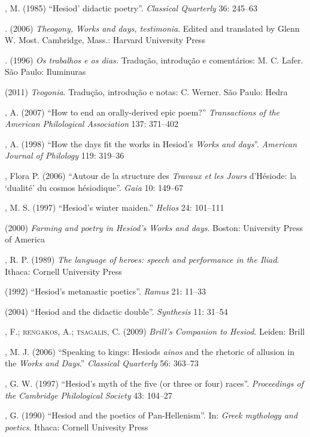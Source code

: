 \begin{bibliohedra}
, M. (1985) “Hesiod’ didactic poetry”. \textit{Classical Quarterly} 36: 245--63 
  
. (2006) \textit{Theogony, Works and days, testimonia}. Edited and
translated by Glenn W. Most. Cambridge, Mass.: Harvard University Press
  
. (1996)\textit{ Os trabalhos e os dias.} Tradução, introdução e
comentários: M. C. Lafer. São Paulo: Iluminuras 
  
\titidem (2011) \textit{Teogonia}. Tradução, introdução e notas: C.
Werner. São Paulo: Hedra
  
, A. (2007) “How to end an orally-derived epic poem?”
\textit{Transactions of the American Philological Association} 137:
371--402
  
, A. (1998) “How the days fit the works in Hesiod’s
\textit{Works and days}”. \textit{American Journal of Philology} 119:
319--36
  
, Flora P. (2006) “Autour de la structure des \textit{Travaux
et les Jours} d’Hésiode: la ‘dualité’ du cosmos hésiodique”.
\textit{Gaia} 10: 149--67
  
, M. S. (1997) “Hesiod’s winter maiden.” \textit{Helios} 24:
101--111

\titidem  (2000) \textit{Farming and poetry in Hesiod’s Works and days}.
Boston: University Press of America
  
, R. P. (1989) \textit{The language of heroes: speech and
performance in the Iliad}. Ithaca: Cornell University Press

\titidem (1992) “Hesiod’s metanastic poetics”. \textit{Ramus} 21: 11--33
  
\titidem (2004) “Hesiod and the didactic double”. \textit{Synthesis} 11:
31--54
  
, F.; \textsc{rengakos}, A.; \textsc{tsagalis}, C. (2009) \textit{Brill’s
Companion to Hesiod}. Leiden: Brill
  
, M. J. (2006) “Speaking to kings: Hesiods \textit{ainos} and the
rhetoric of allusion in the \textit{Works and Days}.” \textit{Classical
Quarterly}  56: 363--73
  
, G. W. (1997) “Hesiod’s myth of the five (or three or four) races”.
\textit{Proceedings of the Cambridge Philological Society} 43: 104--27
  
, G. (1990) “Hesiod and the\textit{} poetics of Pan-Hellenism”. In:
\textit{Greek mythology and poetics}. Ithaca: Cornell Univesity Press
  

\end{bibliohedra}
